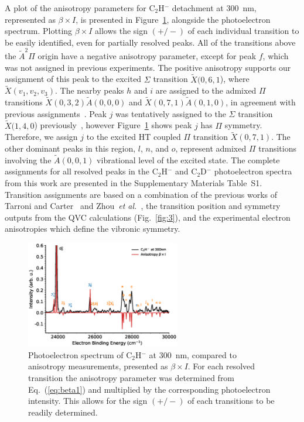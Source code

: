 \documentclass[aip,graphicx]{revtex4-1}
\begin{document}
A plot of the anisotropy parameters for C$_2$H$^-$ detachment at 300~nm, represented as $\beta\times I$, is presented in Figure~\ref{fig:6}, alongside the photoelectron spectrum. Plotting $\beta\times I$ allows the sign $(+/-)$ of each individual transition to be easily identified, even for partially resolved peaks. All of the transitions above the $\tilde{A} ^2\Pi$ origin have a negative anisotropy parameter, except for peak $f$, which was not assigned in previous experiments. The positive anisotropy supports our assignment of this peak to the excited $\Sigma$ transition $\tilde{X}(0,6,1$), where $\tilde{X}(v_1,v_2,v_3)$. The nearby peaks $h$ and $i$  are assigned to the admixed $\Pi$ transitions $\tilde{X}(0,3,2)\tilde{A}(0,0,0)$ and $\tilde{X}(0,7,1)\tilde{A}(0,1,0)$, in agreement with previous assignments~\cite{zho07,tar03}. Peak $j$ was tentatively assigned to the $\Sigma$ transition $\tilde{X}(1,4,0$) previously~\cite{zho07}, however Figure~\ref{fig:6} shows peak $j$ has $\Pi$ symmetry. Therefore, we assign $j$ to the excited HT coupled $\Pi$ transition $\tilde{X}(0,7,1)$. The other dominant peaks in this region, $l$, $n$, and $o$, represent admixed $\Pi$ transitions involving the $\tilde{A}(0,0,1)$ vibrational level of the excited state. The complete assignments for all resolved peaks in the C$_2$H$^-$ and C$_2$D$^-$ photoelectron spectra from this work are presented in the Supplementary Materials Table~S1. Transition assignments are based on a combination of the previous works of Tarroni and Carter~\cite{tar03} and Zhou~\emph{et al.}~\cite{zho07}, the transition position and symmetry outputs from the QVC calculations (Fig.~\ref{fig:3}), and the experimental electron anisotropies which define the vibronic symmetry.

\begin{figure}[th!]
	\includegraphics[width=0.6\textwidth]{figures/Fig6}
	\caption{Photoelectron spectrum of C$_2$H$^-$ at 300~nm, compared to anisotropy measurements, presented as $\beta\times I$. For each resolved transition the anisotropy parameter was determined from Eq.~(\ref{eq:beta1}) and multiplied by the corresponding photoelectron intensity. This allows for the sign $(+/-)$ of each transitions to be readily determined.}
	\label{fig:6}
\end{figure}
\end{document}
